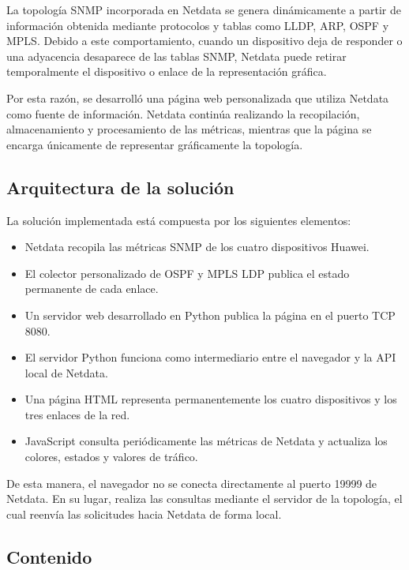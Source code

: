 La topología SNMP incorporada en Netdata se genera dinámicamente a partir de
información obtenida mediante protocolos y tablas como LLDP, ARP, OSPF y MPLS.
Debido a este comportamiento, cuando un dispositivo deja de responder o una
adyacencia desaparece de las tablas SNMP, Netdata puede retirar temporalmente
el dispositivo o enlace de la representación gráfica.

Por esta razón, se desarrolló una página web personalizada que utiliza Netdata
como fuente de información. Netdata continúa realizando la recopilación,
almacenamiento y procesamiento de las métricas, mientras que la página se
encarga únicamente de representar gráficamente la topología.

\subsection{Arquitectura de la solución}

La solución implementada está compuesta por los siguientes elementos:

\begin{itemize}
    \item Netdata recopila las métricas SNMP de los cuatro dispositivos Huawei.
    \item El colector personalizado de OSPF y MPLS LDP publica el estado permanente
    de cada enlace.
    \item Un servidor web desarrollado en Python publica la página en el puerto
    TCP 8080.
    \item El servidor Python funciona como intermediario entre el navegador y la
    API local de Netdata.
    \item Una página HTML representa permanentemente los cuatro dispositivos y
    los tres enlaces de la red.
    \item JavaScript consulta periódicamente las métricas de Netdata y actualiza
    los colores, estados y valores de tráfico.
\end{itemize}

De esta manera, el navegador no se conecta directamente al puerto 19999 de
Netdata. En su lugar, realiza las consultas mediante el servidor de la
topología, el cual reenvía las solicitudes hacia Netdata de forma local.


\subsection{Contenido}

